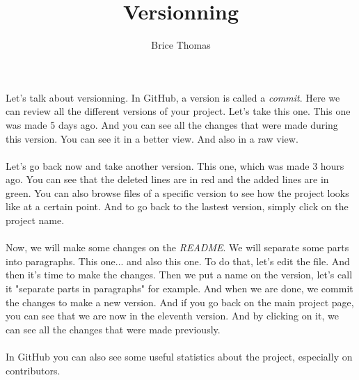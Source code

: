 \documentclass{article}
\title{Versionning}
\author{Brice Thomas}
\date{}
\begin{document}
\maketitle

Let's talk about versionning. In GitHub, a version is called a \emph{commit}. Here we can review all the different versions of your project. Let's take this one. This one was made 5 days ago. And you can see all the changes that were made during this version. You can see it in a better view. And also in a raw view.
\\\\
Let's go back now and take another version. This one, which was made 3 hours ago. You can see that the deleted lines are in red and the added lines are in green. You can also browse files of a specific version to see how the project looks like at a certain point. And to go back to the lastest version, simply click on the project name.
\\\\
Now, we will make some changes on the \emph{README}. We will separate some parts into paragraphs. This one... and also this one. To do that, let's edit the file. And then it's time to make the changes. Then we put a name on the version, let's call it "separate parts in paragraphs" for example. And when we are done, we commit the changes to make a new version. And if you go back on the main project page, you can see that we are now in the eleventh version. And by clicking on it, we can see all the changes that were made previously.
\\\\
In GitHub you can also see some useful statistics about the project, especially on contributors.
\end{document}
